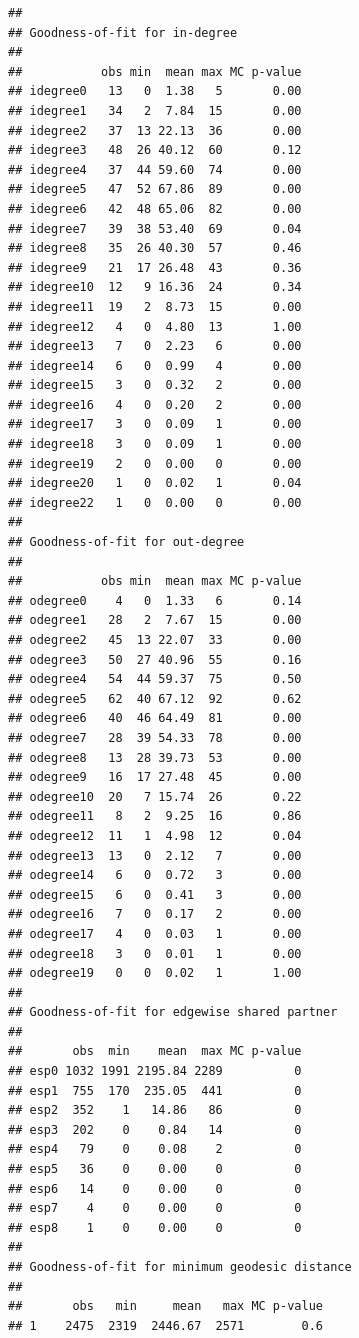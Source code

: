 \documentclass[
]{book}
\begin{document}
\begin{verbatim}
## 
## Goodness-of-fit for in-degree 
## 
##           obs min  mean max MC p-value
## idegree0   13   0  1.38   5       0.00
## idegree1   34   2  7.84  15       0.00
## idegree2   37  13 22.13  36       0.00
## idegree3   48  26 40.12  60       0.12
## idegree4   37  44 59.60  74       0.00
## idegree5   47  52 67.86  89       0.00
## idegree6   42  48 65.06  82       0.00
## idegree7   39  38 53.40  69       0.04
## idegree8   35  26 40.30  57       0.46
## idegree9   21  17 26.48  43       0.36
## idegree10  12   9 16.36  24       0.34
## idegree11  19   2  8.73  15       0.00
## idegree12   4   0  4.80  13       1.00
## idegree13   7   0  2.23   6       0.00
## idegree14   6   0  0.99   4       0.00
## idegree15   3   0  0.32   2       0.00
## idegree16   4   0  0.20   2       0.00
## idegree17   3   0  0.09   1       0.00
## idegree18   3   0  0.09   1       0.00
## idegree19   2   0  0.00   0       0.00
## idegree20   1   0  0.02   1       0.04
## idegree22   1   0  0.00   0       0.00
## 
## Goodness-of-fit for out-degree 
## 
##           obs min  mean max MC p-value
## odegree0    4   0  1.33   6       0.14
## odegree1   28   2  7.67  15       0.00
## odegree2   45  13 22.07  33       0.00
## odegree3   50  27 40.96  55       0.16
## odegree4   54  44 59.37  75       0.50
## odegree5   62  40 67.12  92       0.62
## odegree6   40  46 64.49  81       0.00
## odegree7   28  39 54.33  78       0.00
## odegree8   13  28 39.73  53       0.00
## odegree9   16  17 27.48  45       0.00
## odegree10  20   7 15.74  26       0.22
## odegree11   8   2  9.25  16       0.86
## odegree12  11   1  4.98  12       0.04
## odegree13  13   0  2.12   7       0.00
## odegree14   6   0  0.72   3       0.00
## odegree15   6   0  0.41   3       0.00
## odegree16   7   0  0.17   2       0.00
## odegree17   4   0  0.03   1       0.00
## odegree18   3   0  0.01   1       0.00
## odegree19   0   0  0.02   1       1.00
## 
## Goodness-of-fit for edgewise shared partner 
## 
##       obs  min    mean  max MC p-value
## esp0 1032 1991 2195.84 2289          0
## esp1  755  170  235.05  441          0
## esp2  352    1   14.86   86          0
## esp3  202    0    0.84   14          0
## esp4   79    0    0.08    2          0
## esp5   36    0    0.00    0          0
## esp6   14    0    0.00    0          0
## esp7    4    0    0.00    0          0
## esp8    1    0    0.00    0          0
## 
## Goodness-of-fit for minimum geodesic distance 
## 
##       obs   min     mean   max MC p-value
## 1    2475  2319  2446.67  2571        0.6

\end{verbatim}
\end{document}
